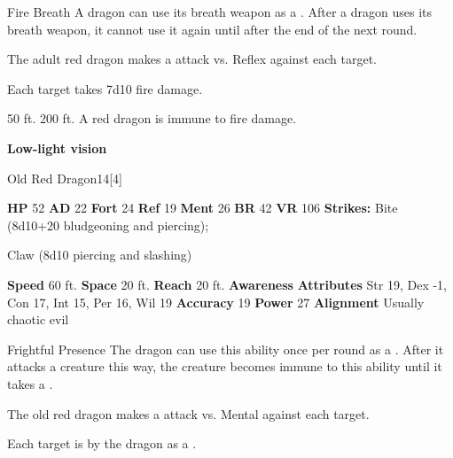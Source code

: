     \begin{freeability}{Fire Breath}
      A dragon can use its breath weapon as a .
      After a dragon uses its breath weapon, it cannot use it again until after the end of the next round.
      \par The adult red dragon makes a  attack
        vs. Reflex against each target.
    
    \hit Each target takes 7d10 fire damage.
    \end{freeability}
  
      
       50 ft.
     200 ft.
     A red dragon is immune to fire damage.
    \par\noindent\textbf{Low-light vision}
  

  \begin{monsubsection}{Old Red Dragon}{14}[4]
    \vspace{-1em}\vspace{-1em}
    \vspace{0em}

    
    

    \begin{spellcontent}
      \begin{spelltargetinginfo}
        \pari \textbf{HP} 52 \monsep
          \textbf{AD} 22 \monsep
          \textbf{Fort} 24 \monsep
          \textbf{Ref} 19 \monsep
          \textbf{Ment} 26
        \pari \textbf{BR} 42 \monsep
        \textbf{VR} 106
        \pari \textbf{Strikes:}
            Bite  (8d10+20 bludgeoning and piercing);
\par Claw  (8d10 piercing and slashing)
      \end{spelltargetinginfo}
    \end{spellcontent}
    \begin{monsterfooter}
      \pari \textbf{Speed} 60 ft. \monsep
        \textbf{Space} 20 ft. \monsep
        \textbf{Reach} 20 ft.
      \pari \textbf{Awareness} 
      \pari \textbf{Attributes}
        Str 19, Dex -1,
        Con 17, Int 15,
        Per 16, Wil 19
      \pari \textbf{Accuracy} 19 \monsep
        \textbf{Power} 27
      \pari \textbf{Alignment} Usually chaotic evil
    \end{monsterfooter}
  \end{monsubsection}
  \begin{freeability}{Frightful Presence}
      The dragon can use this ability once per round as a .
      After it attacks a creature this way, the creature becomes immune to this ability until it takes a .
      \par The old red dragon makes a  attack
        vs. Mental against each target.
    
    \hit Each target is  by the dragon as a .
    \end{freeability}
  

